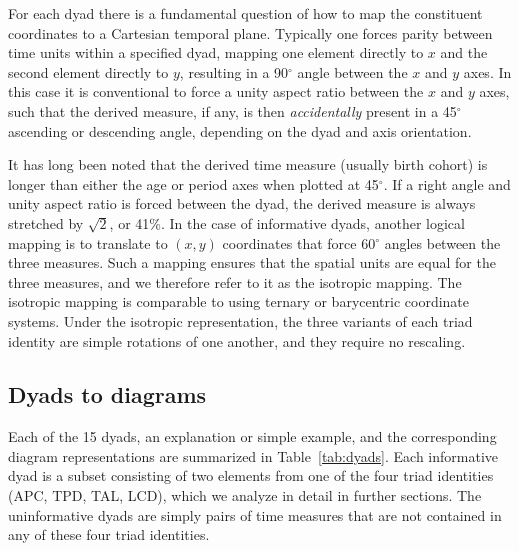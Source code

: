 \documentclass[12pt,oneside,a4paper]{article} %
\begin{document}
For each dyad there is a fundamental question of how to map the constituent
coordinates to a Cartesian temporal plane. Typically one forces parity between time units within
a specified dyad, mapping one element directly to $x$ and the second element
directly to $y$, resulting in a 90$^\circ$ angle between the $x$ and $y$
axes. In this case it is conventional to force a unity aspect ratio
between the $x$ and $y$ axes, such that the derived measure, if any, is then
\textit{accidentally} present in a 45$^\circ$ ascending or descending angle,
depending on the dyad and axis orientation. 

It has long been noted \citep{zeuner1869abhandlungen, perozzo1880della} that the derived time measure (usually birth cohort) is
longer than either the age or period axes when plotted at 45$^\circ$.
If a right angle and unity aspect ratio is forced between the dyad, the derived measure is always stretched by
$\sqrt{2}$, or 41\%. In the case of informative dyads, another
logical mapping is to translate to $(x,y)$ coordinates that force 60$^\circ$
angles between the three measures. Such a mapping ensures that the spatial units are equal for the three measures, and we therefore refer to it as the isotropic mapping. The isotropic mapping
is comparable to using ternary or barycentric coordinate systems. 
Under the isotropic representation, the three variants of each triad identity
are simple rotations of one another, and they require no rescaling.

\subsection{Dyads to diagrams}
Each of the 15 dyads, an explanation or simple example,
and the corresponding diagram representations are summarized in
Table~\ref{tab:dyads}. Each informative dyad is a subset consisting of two
elements from one of the four triad identities (APC, TPD, TAL, LCD), which we
analyze in detail in further sections. The uninformative dyads are simply pairs of time measures that are not contained in any of these four
triad identities.
\pagebreak
\end{document}
